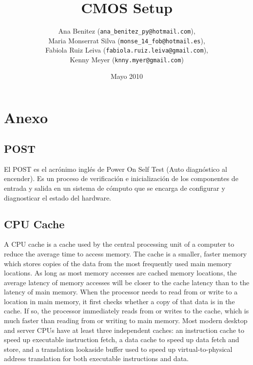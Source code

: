 \documentclass[12pt,oneside,a4paper]{article}
\begin{document}
\title{CMOS Setup}
\author{Ana Benitez (\texttt{ana\_benitez\_py@hotmail.com}), \\
		Maria Monserrat Silva (\texttt{monse\_14\_fob@hotmail.es}), \\
		Fabiola Ruiz Leiva (\texttt{fabiola.ruiz.leiva@gmail.com}), \\ 
		Kenny Meyer (\texttt{knny.myer@gmail.com})}
\date{Mayo 2010}
\maketitle
\clearpage

%

% 
\setcounter{tocdepth}{3}
\tableofcontents
\newpage






\section{Anexo}\label{sec:anexo}
	\subsection{POST}\label{sub:post}
	
		El POST es el acrónimo inglés de Power On Self Test (Auto diagnóstico
		al encender). Es un proceso de verificación e inicialización de los
		componentes de entrada y salida en un sistema de cómputo que se encarga
		de configurar y diagnosticar el estado del hardware.

	\subsection{CPU Cache}\label{sub:cpu cache}
	
		A CPU cache is a cache used by the central processing unit of a
		computer to reduce the average time to access memory. The cache is a
		smaller, faster memory which stores copies of the data from the most
		frequently used main memory locations. As long as most memory accesses
		are cached memory locations, the average latency of memory accesses
		will be closer to the cache latency than to the latency of main memory.
		When the processor needs to read from or write to a location in main
		memory, it first checks whether a copy of that data is in the cache. If
		so, the processor immediately reads from or writes to the cache, which
		is much faster than reading from or writing to main memory.  Most
		modern desktop and server CPUs have at least three independent caches:
		an instruction cache to speed up executable instruction fetch, a data
		cache to speed up data fetch and store, and a translation lookaside
		buffer used to speed up virtual-to-physical address translation for
		both executable instructions and data.
\end{document}
